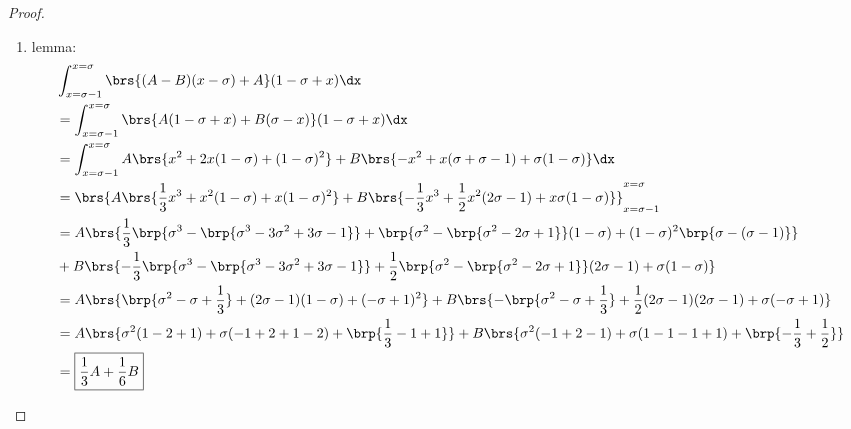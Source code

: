 \begin{proof}
\begin{enumerate}
  \item lemma: \label{ilem:stromberg_AB} 
    \begin{align*}
        &\int_{x=\sigma-1}^{x=\sigma}   \brs{ (A-B)(x-\sigma)+A           } (1-\sigma+x)    \dx
    \\&= \int_{x=\sigma-1}^{x=\sigma}   \brs{ A(1-\sigma+x) + B(\sigma-x) } (1-\sigma+x)    \dx
    \\&= \int_{x=\sigma-1}^{x=\sigma}  A\brs{ x^2 + 2x(1-\sigma)        + (1-\sigma)^2    } 
                                     + B\brs{-x^2 +  x(\sigma+\sigma-1) + \sigma(1-\sigma)} \dx
    \\&= \brs{ A\brs{ \frac{1}{3}x^3 +             x^2(1-\sigma ) + x(1-\sigma)^2    } 
             + B\brs{-\frac{1}{3}x^3 + \frac{1}{2} x^2(2\sigma-1) + x\sigma(1-\sigma)}
             }_{x=\sigma-1}^{x=\sigma}
    \\&= A\brs{ \frac{1}{3}\brp{\sigma^3-\brp{\sigma^3-3\sigma^2+3\sigma-1}} +            \brp{\sigma^2-\brp{\sigma^2-2\sigma+1}}(1-\sigma ) + (1-\sigma)^2\brp{\sigma-(\sigma-1)} } 
    \\&+ B\brs{-\frac{1}{3}\brp{\sigma^3-\brp{\sigma^3-3\sigma^2+3\sigma-1}} + \frac{1}{2}\brp{\sigma^2-\brp{\sigma^2-2\sigma+1}}(2\sigma-1) + \sigma(1-\sigma)                    }
    \\&= A\brs{ \brp{\sigma^2 - \sigma + \frac{1}{3} } +            (2\sigma-1)(1-\sigma ) + (-\sigma+1)^2     }
       + B\brs{-\brp{\sigma^2 - \sigma + \frac{1}{3} } + \frac{1}{2}(2\sigma-1)(2\sigma-1) + \sigma(-\sigma+1) }
    \\&= A\brs{\sigma^2( 1-2+1) + \sigma(-1+2+1-2) + \brp{ \frac{1}{3}-1+1}}
       + B\brs{\sigma^2(-1+2-1) + \sigma( 1-1-1+1) + \brp{-\frac{1}{3}+\frac{1}{2}}}
    \\&= \boxed{\frac{1}{3}A + \frac{1}{6}B}
    \end{align*}


\end{enumerate}
\end{proof}
